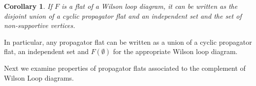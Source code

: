 \documentclass[11pt]{article}
\newcommand{\cP}{\mathcal{P}}
\newcommand{\Prop}{\textrm{Prop}}
\newtheorem{cor}[thm]{Corollary}
\theoremstyle{remark}
\theoremstyle{definition}
\newtheorem{dfn}[thm]{Definition}
\begin{document}
\begin{cor} \label{classifyflats}
If $F$ is a flat of a Wilson loop diagram, it can be written as the disjoint union of a cyclic propagator flat and an independent set and the set of non-supportive vertices. \end{cor}
 
In particular, any propagator flat can be written as a union of a cyclic propagator flat, an independent set and $F(\emptyset)$ for the appropriate Wilson loop diagram.

Next we examine properties of propagator flats associated to the complement of Wilson Loop diagrams.




\end{document}
